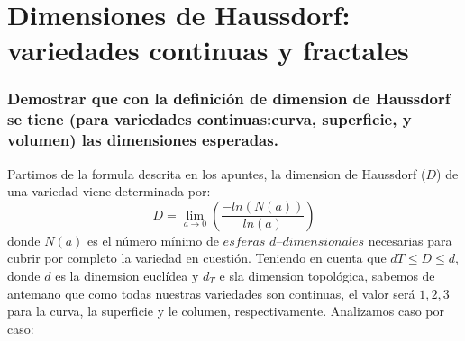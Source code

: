 \section{Dimensiones de Haussdorf: variedades continuas y fractales}
\subsubsection{\large Demostrar que con la definición de dimension de Haussdorf se tiene (para variedades continuas:curva, superficie, y volumen) las dimensiones esperadas.} 

Partimos de la formula descrita en los apuntes, la dimension de Haussdorf ($D$) de una variedad viene determinada por:
\begin{equation}
D=\lim_{a\rightarrow 0}(\frac{-ln(N(a))}{ln(a)})
\end{equation}
donde $N(a)$ es el número mínimo de $esferas$ $d–dimensionales$ necesarias para cubrir por completo la variedad en cuestión.
Teniendo en cuenta que $d T \leq D \leq d$, donde $d$ es la dinemsion euclídea y $d_T$ e sla dimension topológica, sabemos de antemano que como todas nuestras variedades son continuas, el valor será $1,2,3$ para la curva, la superficie y le columen, respectivamente. Analizamos caso por caso: 
